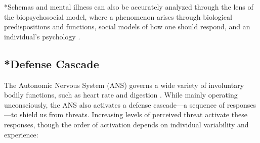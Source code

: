 \documentclass[12pt,letterpaper]{article}
\begin{document}
*Schemas and mental illness can also be accurately analyzed through the lens of the biopsychosocial model, where a phenomenon arises through biological predispositions and functions, social models of how one should respond, and an individual's psychology \cite{wadeBiopsychosocial}.
\subsection{*Defense Cascade}
The Autonomic Nervous System (ANS) governs a wide variety of involuntary bodily functions, such as heart rate and digestion \cite{kozlowskaDefenseCascade}. While mainly operating unconsciously, the ANS also activates a defense cascade—a sequence of responses—to shield us from threats. Increasing levels of perceived threat activate these responses, though the order of activation depends on individual variability and experience:
\end{document}

